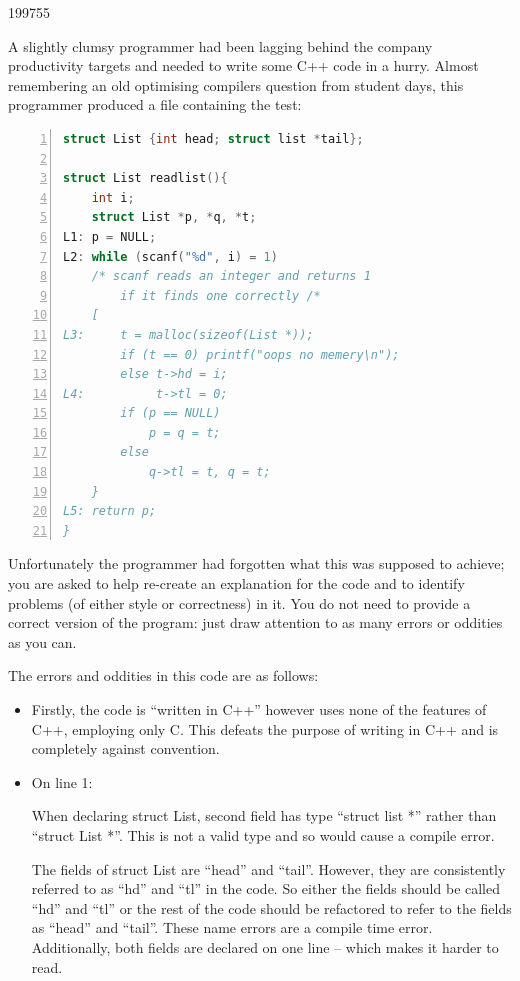 \documentclass[10pt,\jkfside,a4paper]{article}
\begin{document}
\begin{examquestion}{1997}{5}{5}

A slightly clumsy programmer had been lagging behind the company
productivity targets and needed to write some C++ code in a hurry. Almost
remembering an old optimising compilers question from student days, this
programmer produced a file containing the test:

\begin{lstlisting}[language=C, numbers=left]
struct List {int head; struct list *tail};

struct List readlist(){
	int i;
	struct List *p, *q, *t;
L1:	p = NULL;
L2:	while (scanf("%d", i) = 1)
	/* scanf reads an integer and returns 1
		if it finds one correctly /*
	[
L3:		t = malloc(sizeof(List *));
		if (t == 0) printf("oops no memery\n");
		else t->hd = i;
L4:			 t->tl = 0;
		if (p == NULL)
			p = q = t;
		else
			q->tl = t, q = t;
	}
L5:	return p;
}

\end{lstlisting}

Unfortunately the programmer had forgotten what this was supposed to
achieve; you are asked to help re-create an explanation for the code and to
identify problems (of either style or correctness) in it. You do not need to
provide a correct version of the program: just draw attention to as many
errors or oddities as you can.

The errors and oddities in this code are as follows:

\begin{itemize}

\item Firstly, the code is ``written in C++'' however uses none of the
features of C++, employing only C. This defeats the purpose of writing in
C++ and is completely against convention.

\item On line 1:

When declaring struct List, second field has type ``struct list *'' rather
than ``struct List *''. This is not a valid type and so would cause a
compile error.

The fields of struct List are ``head'' and ``tail''. However, they are
consistently referred to as ``hd'' and ``tl'' in the code. So either the
fields should be called ``hd'' and ``tl'' or the rest of the code should be
refactored to refer to the fields as ``head'' and ``tail''. These
name errors are a compile time error. Additionally, both fields are declared
 on one line -- which makes it harder to read.


\end{itemize}
\end{examquestion}
\end{document}
